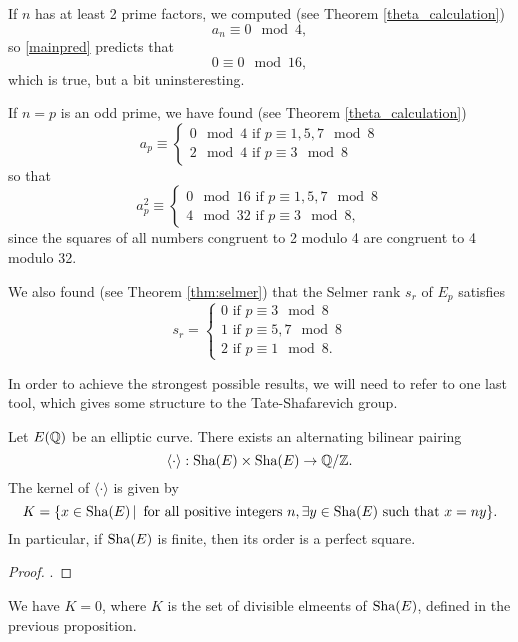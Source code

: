 \documentclass[12pt, a4paper]{report}
\begin{document}
If $n$ has at least 2 prime factors, we computed (see Theorem \autoref{theta_calculation})
\[a_n \equiv 0 \mod{4},\]
so \autoref{mainpred} predicts that
\[0 \equiv 0 \mod{16},\]
which is true, but a bit uninsteresting.

If $n = p$ is an odd prime, we have found (see Theorem \autoref{theta_calculation})
\[a_p \equiv \begin{cases}
    0 \mod{4} \text{ if } p \equiv 1,5,7 \mod{8} \\
    2 \mod{4} \text{ if } p \equiv 3 \mod{8}
  \end{cases}
\]
so that
\[a_p^2 \equiv
  \begin{cases}
    0 \mod{16} \text{ if } p \equiv 1,5,7 \mod{8} \\
    4 \mod {32} \text{ if } p \equiv 3 \mod{8},
  \end{cases}
\]
since the squares of all numbers congruent to 2 modulo 4 are congruent to 4
modulo 32.

We also found (see Theorem \autoref{thm:selmer}) that the Selmer rank $s_r$ of
$E_p$ satisfies
\begin{equation*}
  s_r =
  \begin{cases}
    0 \text{ if } p \equiv 3 \mod{8} \\
    1 \text{ if } p \equiv 5,7 \mod{8} \\
    2 \text{ if } p \equiv 1 \mod{8}.
  \end{cases}
\end{equation*}

In order to achieve the strongest possible results, we will need to refer to one
last tool, which gives some structure to the Tate-Shafarevich group.
\begin{prop}
  Let $E({\mathbb Q})$ be an elliptic curve. There exists an alternating bilinear
  pairing
  \[\langle \cdot \rangle : \text{\normalfont Sha}(E) \times \text{\normalfont Sha}(E) \rightarrow {\mathbb Q} / {\mathbb Z}.\]
  The kernel of $\langle \cdot \rangle$ is given by 
  \[K = \{ x \in \text{\normalfont Sha}(E) \, | \, \textnormal{ for all positive integers } n, 
    \exists y \in \text{\normalfont Sha}(E) \textnormal{ such that } x = ny\}.\]
  In particular, if $\text{\normalfont Sha}(E)$ is finite, then its order is a perfect square. 
\end{prop}

\begin{proof}
  \cite[See][]{Cassels}.
\end{proof}

\begin{conj} \label{cassels_conj}
  We have $K = 0$, where $K$ is the set of divisible elmeents of $\text{\normalfont Sha}(E)$,
  defined in the previous proposition.
\end{conj}
\end{document}

